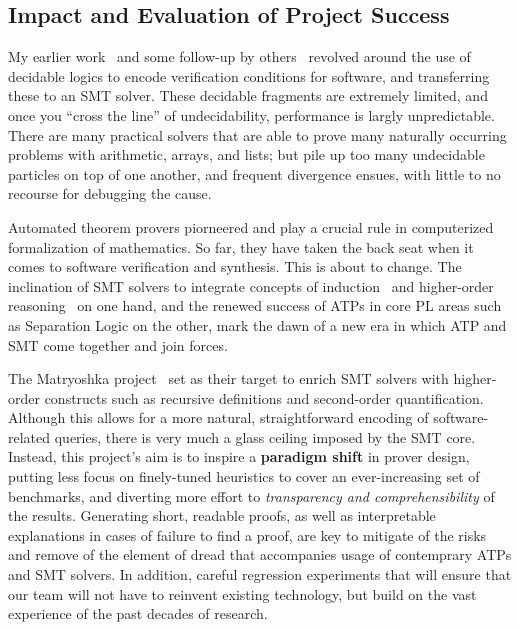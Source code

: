\subsection{Impact and Evaluation of Project Success}

My earlier work~\cite{phd} and some follow-up by others~\cite{padon,feldman} revolved around the use of decidable logics to encode verification conditions for software,
and transferring these to an SMT solver.
These decidable fragments are extremely limited, and once you ``cross the line'' of undecidability, performance is largly unpredictable.
There are many practical solvers that are able to prove many naturally occurring problems with arithmetic, arrays, and lists;
but pile up too many undecidable particles on top of one another, and frequent divergence ensues, with little to no recourse for debugging the cause.

Automated theorem provers piorneered and play a crucial rule in computerized formalization of mathematics.
So far, they have taken the back seat when it comes to software verification and synthesis.
This is about to change.
The inclination of SMT solvers to integrate concepts of induction~\cite{reynlods-kuncak} and higher-order reasoning~\cite{smt-from-matryoshka} on one hand,
and the renewed success of ATPs in core PL areas such as Separation Logic on the other,
mark the dawn of a new era in which ATP and SMT come together and join forces.

The Matryoshka project~\cite{what} set as their target to enrich SMT solvers with higher-order constructs such as recursive definitions and second-order quantification.
Although this allows for a more natural, straightforward encoding of software-related queries, there is very much a glass ceiling imposed by the SMT core.
Instead, this project's aim is to inspire a \textbf{paradigm shift} in prover design, putting less focus on finely-tuned heuristics to cover an ever-increasing set of benchmarks, and diverting more effort to \emph{transparency and comprehensibility} of the results.
Generating short, readable proofs, as well as interpretable explanations in cases of failure to find a proof,
are key to mitigate of the risks and remove of the element of dread that accompanies usage of contemprary ATPs and SMT solvers.
In addition, careful regression experiments that will ensure that our team will not have to reinvent existing technology, but build on the vast experience of the past decades of research.
